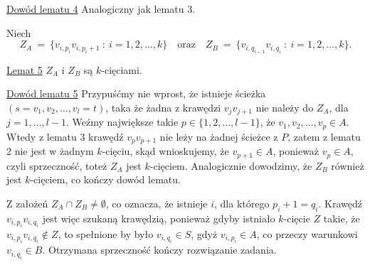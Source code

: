 \documentclass[12pt]{article}
\begin{document}
	\medskip
	
	\underline{Dowód lematu 4} Analogiczny jak lematu 3.
	
	\medskip
	
	Niech
	\[ Z_{A} \ = \ \{v_{i, p_{i}} v_{i, p_{i} + 1} \ : \ i = 1, 2, \ldots, k\}
	\quad \text{oraz} \quad Z_{B} \ = \ \{v_{i, q_{i - 1}} v_{i, q_{i}} \ : \ i
	= 1, 2, \ldots, k\} \text{.} \]
	
	\medskip
	
	\underline{Lemat 5} \(Z_{A}\) i \(Z_{B}\) są \(k\)-cięciami.
	
	\medskip
	
	\underline{Dowód lematu 5} Przypuśćmy nie wprost, że istnieje ścieżka \((s =
	v_{1}, v_{2}, \ldots, v_{l} = t)\), taka że żadna z krawędzi \(v_{j} v_{j +
	1}\) nie należy do \(Z_{A}\), dla \(j = 1, \ldots, l - 1\). Weźmy największe
	takie \(p \in \{1, 2, \ldots, l - 1\}\), że \(v_{1}, v_{2}, \ldots, v_{p}
	\in A\). Wtedy z lematu 3 krawędź \(v_{p} v_{p + 1}\) nie leży na żadnej
	ścieżce z \(P\), zatem z lematu 2 nie jest w żadnym \(k\)-cięciu, skąd
	wnioskujemy, że \(v_{p + 1} \in A\), ponieważ \(v_{p} \in A\), czyli
	sprzeczność, toteż \(Z_{A}\) jest \(k\)-cięciem. Analogicznie dowodzimy, że
	\(Z_{B}\) również jest \(k\)-cięciem, co kończy dowód lematu.
	
	\medskip
	
	Z założeń \(Z_{A} \cap Z_{B} \neq \emptyset\), co oznacza, że istnieje
	\(i\), dla którego \(p_{i} + 1 = q_{i}\). Krawędź \(v_{i, p_{i}} v_{i,
	q_{i}}\) jest więc szukaną krawędzią, ponieważ gdyby istniało \(k\)-cięcie
	\(Z\) takie, że \(v_{i, p_{i}} v_{i, q_{i}} \notin Z\), to spełnione by było
	\(v_{i, q_{i}} \in S\), gdyż \(v_{i, p_{i}} \in A\), co przeczy warunkowi
	\(v_{i, q_{i}} \in B\). Otrzymana sprzeczność kończy rozwiązanie zadania.
\end{document}
